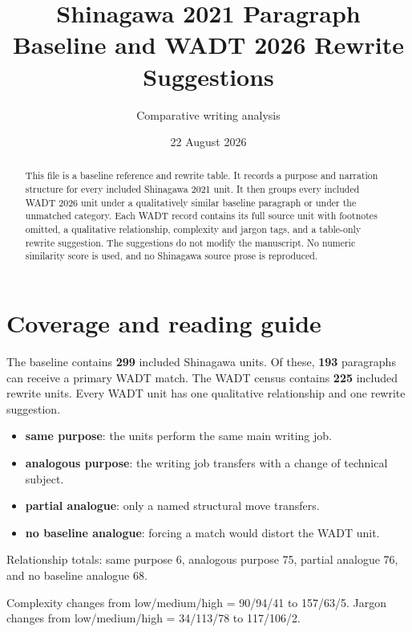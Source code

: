 \documentclass[10pt]{article}
\title{Shinagawa 2021 Paragraph Baseline and WADT 2026 Rewrite Suggestions}\author{Comparative writing analysis}\date{22 August 2026}
\begin{document}
\maketitle
\begin{abstract}
This file is a baseline reference and rewrite table. It records a purpose and narration structure for every included Shinagawa 2021 unit. It then groups every included WADT 2026 unit under a qualitatively similar baseline paragraph or under the unmatched category. Each WADT record contains its full source unit with footnotes omitted, a qualitative relationship, complexity and jargon tags, and a table-only rewrite suggestion. The suggestions do not modify the manuscript. No numeric similarity score is used, and no Shinagawa source prose is reproduced.
\end{abstract}
\section{Coverage and reading guide}
The baseline contains \textbf{299} included Shinagawa units. Of these, \textbf{193} paragraphs can receive a primary WADT match. The WADT census contains \textbf{225} included rewrite units. Every WADT unit has one qualitative relationship and one rewrite suggestion.
\begin{itemize}
\item \textbf{same purpose}: the units perform the same main writing job.
\item \textbf{analogous purpose}: the writing job transfers with a change of technical subject.
\item \textbf{partial analogue}: only a named structural move transfers.
\item \textbf{no baseline analogue}: forcing a match would distort the WADT unit.
\end{itemize}
Relationship totals: same purpose 6, analogous purpose 75, partial analogue 76, and no baseline analogue 68.

Complexity changes from low/medium/high = 90/94/41 to 157/63/5. Jargon changes from low/medium/high = 34/113/78 to 117/106/2.
\end{document}
